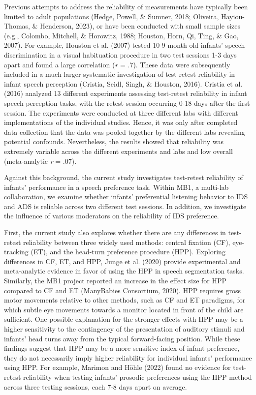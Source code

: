 \documentclass[
  english,
  man,floatsintext]{apa6}
\begin{document}
Previous attempts to address the reliability of measurements have typically been limited to adult populations (Hedge, Powell, \& Sumner, 2018; Oliveira, Hayiou-Thomas, \& Henderson, 2023), or have been conducted with small sample sizes (e.g., Colombo, Mitchell, \& Horowitz, 1988; Houston, Horn, Qi, Ting, \& Gao, 2007).
For example, Houston et al. (2007) tested 10 9-month-old infants' speech discrimination in a visual habituation procedure in two test sessions 1-3 days apart and found a large correlation (\emph{r} = .7).
These data were subsequently included in a much larger systematic investigation of test-retest reliability in infant speech perception (Cristia, Seidl, Singh, \& Houston, 2016).
Cristia et al. (2016) analyzed 13 different experiments assessing test-retest reliability in infant speech perception tasks, with the retest session occurring 0-18 days after the first session.
The experiments were conducted at three different labs with different implementations of the individual studies.
Hence, it was only after completed data collection that the data was pooled together by the different labs revealing potential confounds.
Nevertheless, the results showed that reliability was extremely variable across the different experiments and labs and low overall (meta-analytic \emph{r} = .07).

Against this background, the current study investigates test-retest reliability of infants' performance in a speech preference task.
Within MB1, a multi-lab collaboration, we examine whether infants' preferential listening behavior to IDS and ADS is reliable across two different test sessions.
In addition, we investigate the influence of various moderators on the reliability of IDS preference.

First, the current study also explores whether there are any differences in test-retest reliability between three widely used methods: central fixation (CF), eye-tracking (ET), and the head-turn preference procedure (HPP).
Exploring differences in CF, ET, and HPP, Junge et al. (2020) provide experimental and meta-analytic evidence in favor of using the HPP in speech segmentation tasks.
Similarly, the MB1 project reported an increase in the effect size for HPP compared to CF and ET (ManyBabies Consortium, 2020).
HPP requires gross motor movements relative to other methods, such as CF and ET paradigms, for which subtle eye movements towards a monitor located in front of the child are sufficient.
One possible explanation for the stronger effects with HPP may be a higher sensitivity to the contingency of the presentation of auditory stimuli and infants' head turns away from the typical forward-facing position.
While these findings suggest that HPP may be a more sensitive index of infant preference, they do not necessarily imply higher reliability for individual infants' performance using HPP.
For example, Marimon and Höhle (2022) found no evidence for test-retest reliability when testing infants' prosodic preferences using the HPP method across three testing sessions, each 7-8 days apart on average.
\end{document}
